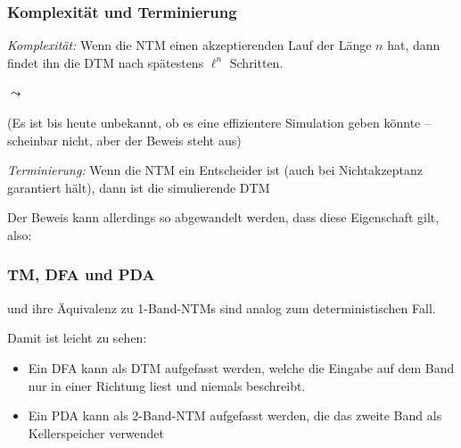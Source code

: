\documentclass[aspectratio=1610,onlymath]{beamer}
\begin{document}
\begin{frame}[t]\frametitle{Komplexität und Terminierung}


\emph{Komplexität:}
Wenn die NTM einen akzeptierenden Lauf der Länge $n$ hat, dann findet ihn die DTM nach
spätestens $\ell^n$ Schritten.
\medskip

$\leadsto$ 

(Es ist bis heute unbekannt, ob es eine effizientere Simulation geben könnte -- scheinbar nicht, aber der Beweis steht aus)\pause\bigskip

\emph{Terminierung:}
Wenn die NTM ein Entscheider ist (auch bei Nichtakzeptanz garantiert hält), dann ist die
simulierende DTM \ghost{\ldots}\\\pause {}
\medskip

Der Beweis kann allerdings so abgewandelt werden, dass diese Eigenschaft gilt, also:


\end{frame}

\begin{frame}\frametitle{TM, DFA und PDA}

 und ihre Äquivalenz zu 1-Band-NTMs sind analog zum deterministischen Fall.
\medskip

Damit ist leicht zu sehen:
\begin{itemize}
\item Ein DFA kann als DTM aufgefasst werden, welche die Eingabe auf dem Band nur in einer Richtung
liest und niemals beschreibt.
\item Ein PDA kann als 2-Band-NTM aufgefasst werden, die das zweite Band als Kellerspeicher verwendet
\end{itemize}

\end{frame}


% 
\end{document}
